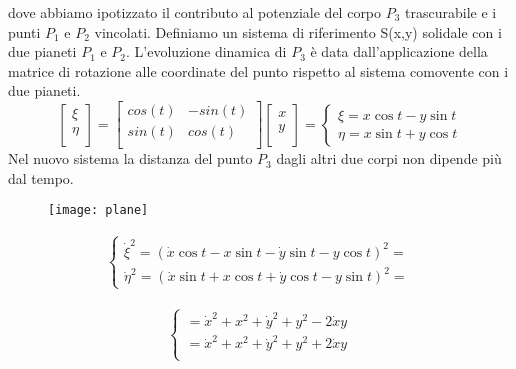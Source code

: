 dove abbiamo ipotizzato il contributo al potenziale del corpo $P_3$ trascurabile e i punti $P_1$ e $P_2$ vincolati. Definiamo un sistema di riferimento S(x,y) solidale con i due pianeti $P_1$ e $P_2$. L'evoluzione dinamica di $P_3$ \`{e} data dall'applicazione della matrice di rotazione alle coordinate del punto rispetto al sistema comovente con i due pianeti.
\begin{equation}
\left [ \begin{array}{c}
\xi\\
\eta\\
\end{array} \right ] =
\left [ \begin{array}{cc}
cos(t) & -sin(t)\\
sin(t) & cos(t) \\
\end{array} \right ]
\left [ \begin{array}{c}
x\\
y\\
\end{array} \right ] =
\left\{\begin{array}{l}
\xi=x \cos t-y \sin t \\
\eta=x \sin t+y \cos t
\end{array}\right.
\end{equation}
Nel nuovo sistema la distanza del punto $P_3$ dagli altri due corpi non dipende pi\`{u} dal tempo.
\begin{figure}[!ht]
\centering
\begin{minipage}{0.5\textwidth}
  \texttt{[image: plane]}
\end{minipage}%
\begin{minipage}{.5\textwidth}
\begin{align}
	\begin{cases}
		\dot{\xi}^2 = (\dot{x} \cos t-x \sin t-\dot{y} \sin t-y \cos t)^2 = \\
		\dot{\eta}^2 =(\dot{x} \sin t+x \cos t+\dot{y} \cos t-y \sin t)^2 = 
	\end{cases}
\end{align}
\end{minipage}
\end{figure}
\vspace{-0.5in}
\begin{align*}
	\begin{cases}
		= \dot{x}^2 + x^2 +\dot{y}^2 + y^2 - 2\dot{x}y\\
		= \dot{x}^2 + x^2 +\dot{y}^2 + y^2 + 2\dot{x}y\\
	\end{cases}
\end{align*}
